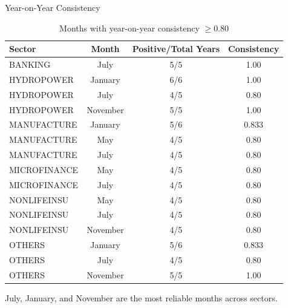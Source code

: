 \documentclass[10pt, aspectratio=169]{beamer}
\begin{document}
\begin{frame}{Year-on-Year Consistency}
\begin{table}
\centering
\caption{Months with year-on-year consistency $\ge 0.80$ \cite{lakonishok1988seasonal}}
\small
\begin{tabular}{lccc}
\toprule
Sector & Month & Positive/Total Years & Consistency \\
\midrule
BANKING       & July     & 5/5  & 1.00 \\
HYDROPOWER    & January  & 6/6  & 1.00 \\
HYDROPOWER    & July     & 4/5  & 0.80 \\
HYDROPOWER    & November & 5/5  & 1.00 \\
MANUFACTURE   & January  & 5/6  & 0.833 \\
MANUFACTURE   & May      & 4/5  & 0.80 \\
MANUFACTURE   & July     & 4/5  & 0.80 \\
MICROFINANCE  & May      & 4/5  & 0.80 \\
MICROFINANCE  & July     & 4/5  & 0.80 \\
NONLIFEINSU   & May      & 4/5  & 0.80 \\
NONLIFEINSU   & July     & 4/5  & 0.80 \\
NONLIFEINSU   & November & 4/5  & 0.80 \\
OTHERS        & January  & 5/6  & 0.833 \\
OTHERS        & July     & 4/5  & 0.80 \\
OTHERS        & November & 5/5  & 1.00 \\
\bottomrule
\end{tabular}
\end{table}
\small July, January, and November are the most reliable months across sectors.
\end{frame}
\end{document}
